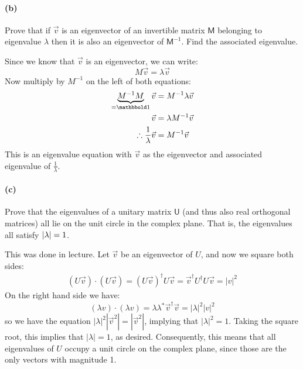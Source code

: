 \documentclass{article}
\begin{document}
\paragraph{(b)}
Prove that if $\vec{v}$ is an eigenvector of an invertible matrix $\mathsf{M}$ belonging to eigenvalue $\lambda$ then it is also an eigenvector of $\mathsf{M}^{-1}$.  
Find the associated eigenvalue.

\begin{solution}
	Since we know that $\vec v$ is an eigenvector, we can write:
	\[
	M \vec v = \lambda \vec v
	\] 
	Now multiply by $M^{-1}$ on the left of both equations:
	\begin{align*}
		\underbrace{M^{-1}M}_{= \mathbbold 1} \vec v &= M^{-1}\lambda \vec v\\
		\vec v &= \lambda M^{-1} \vec v \\
		\therefore \frac{1}{\lambda}\vec v &= M^{-1} \vec v 
	\end{align*}
	This is an eigenvalue equation with $\vec v$ as the eigenvector and associated eigenvalue of 
	$\frac{1}{\lambda}$.
\end{solution}

\paragraph{(c)}
Prove that the eigenvalues of a unitary matrix $\mathsf{U}$ (and thus also real orthogonal matrices) all lie on the unit circle in the complex plane.  That is, the eigenvalues
all satisfy $\left|{\lambda}\right| = 1$.

\begin{solution}
	This was done in lecture. Let $\vec v$ be an eigenvector of $U$, and now we square both sides:
	\begin{align*}
		(U \vec v) \cdot (U \vec v) = (U\vec v)^\dagger U \vec v = \vec v^\dagger U^\dagger U \vec v = |v|^2
	\end{align*}
	On the right hand side we have:
	\[
		(\lambda v) \cdot (\lambda v) = \lambda \lambda^* \vec v^\dagger \vec v = |\lambda|^2 |v|^2
	\] 
	so we have the equation $|\lambda|^2 |\vec v^2| = |\vec v^2|$, implying that $|\lambda|^2 = 1$. Taking 
	the square root, this implies that $|\lambda| = 1$, as desired. Consequently, this means that all 
	eigenvalues of $U$ occupy a unit circle on the complex plane, since those are the only vectors with 
	magnitude 1. 
\end{solution}
\end{document}
